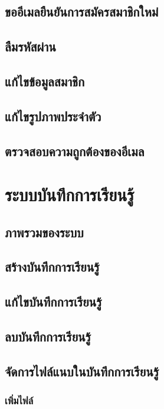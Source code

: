 \documentclass[12pt,oneside]{book}
\begin{document}
\section{ขออีเมลยืนยันการสมัครสมาชิกใหม่}

\section{ลืมรหัสผ่าน}

\section{แก้ไขข้อมูลสมาชิก}

\section{แก้ไขรูปภาพประจำตัว}

\section{ตรวจสอบความถูกต้องของอีเมล}

\chapter{ระบบบันทึกการเรียนรู้}

\section{ภาพรวมของระบบ}

\section{สร้างบันทึกการเรียนรู้}

\section{แก้ไขบันทึกการเรียนรู้}

\section{ลบบันทึกการเรียนรู้}

\section{จัดการไฟล์แนบในบันทึกการเรียนรู้}

\subsection{เพิ่มไฟล์}
\end{document}
